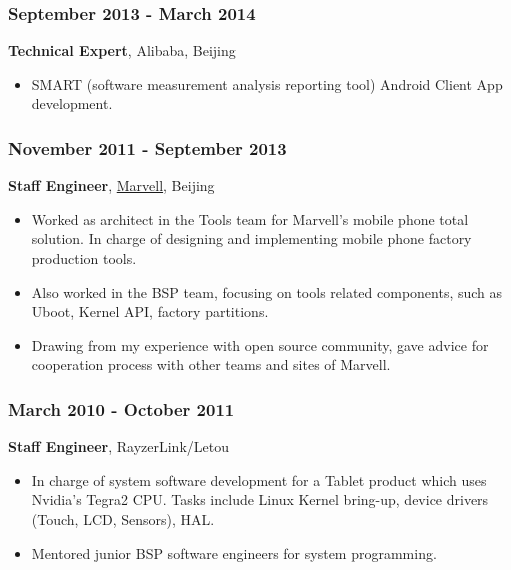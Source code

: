 \documentclass[11pt,dvipdfmx,CJKbookmarks]{article}
\begin{document}
\begin{CJK*}{UTF8}{simsun}
\subsubsection{September 2013 - March 2014}
\label{sec:orgc1227cc}
\textbf{Technical Expert}, Alibaba, Beijing
\begin{itemize}
\item SMART (software measurement analysis reporting tool) Android
Client App development.
\end{itemize}

\subsubsection{November 2011 - September 2013}
\label{sec:orge48d3ba}
\textbf{Staff Engineer}, \href{http://marvell.com}{Marvell}, Beijing

\begin{itemize}
\item Worked as architect in the Tools team for Marvell's mobile phone
total solution. In charge of designing and implementing mobile
phone factory production tools.

\item Also worked in the BSP team, focusing on tools related
components, such as Uboot, Kernel API, factory partitions.
\end{itemize}


\begin{itemize}
\item Drawing from my experience with open source community, gave
advice for cooperation process with other teams and sites of
Marvell.
\end{itemize}


\subsubsection{March 2010 - October 2011}
\label{sec:orgbea8044}

\textbf{Staff Engineer}, RayzerLink/Letou

\begin{itemize}
\item In charge of system software development for a Tablet product
which uses Nvidia's Tegra2 CPU. Tasks include Linux Kernel
bring-up, device drivers (Touch, LCD, Sensors), HAL.

\item Mentored junior BSP software engineers for system programming.
\end{itemize}


\end{CJK*}
\end{document}
